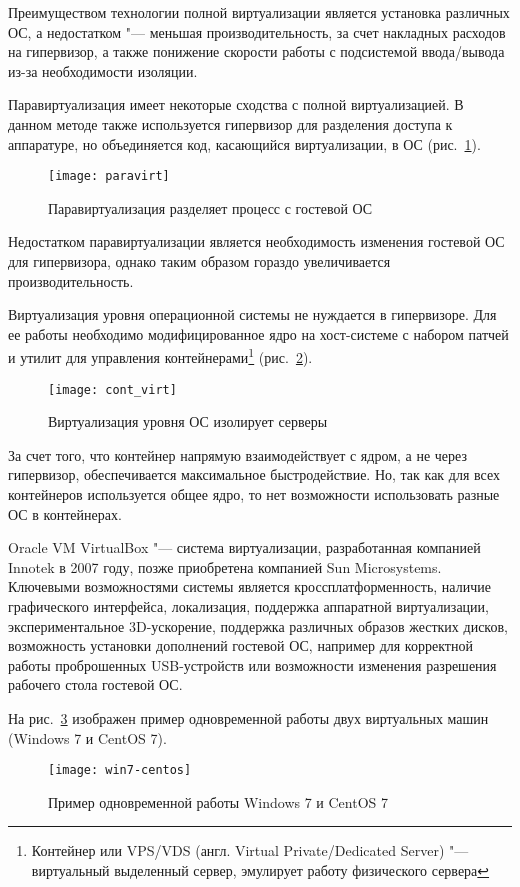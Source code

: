 Преимуществом технологии полной виртуализации является установка различных ОС, а недостатком "--- меньшая производительность, за счет накладных расходов на гипервизор, а также понижение скорости работы с подсистемой ввода/вывода из-за необходимости изоляции.

Паравиртуализация имеет некоторые сходства с полной виртуализацией.
В данном методе также используется гипервизор для разделения доступа к аппаратуре, но объединяется код, касающийся виртуализации, в ОС (рис.~\ref{pic:paravirt}).
\begin{figure}[ht]
    \centering
	\texttt{[image: paravirt]}
	\caption{Паравиртуализация разделяет процесс с гостевой ОС}\label{pic:paravirt}
\end{figure}

Недостатком паравиртуализации является необходимость изменения гостевой ОС для гипервизора, однако таким образом гораздо увеличивается производительность.

Виртуализация уровня операционной системы не нуждается в гипервизоре.
Для ее работы необходимо модифицированное ядро на хост-системе с набором патчей и утилит для управления контейнерами\footnote{Контейнер или VPS/VDS (англ. Virtual Private/Dedicated Server) "--- виртуальный выделенный сервер, эмулирует работу физического сервера} (рис.~\ref{pic:cont_virt}).
\begin{figure}[ht]
    \centering
	\texttt{[image: cont\_virt]}
	\caption{Виртуализация уровня ОС изолирует серверы}\label{pic:cont_virt}
\end{figure}

За счет того, что контейнер напрямую взаимодействует с ядром, а не через гипервизор, обеспечивается максимальное быстродействие. Но, так как для всех контейнеров используется общее ядро, то нет возможности использовать разные ОС в контейнерах.

Oracle VM VirtualBox "--- система виртуализации, разработанная компанией Innotek в 2007 году, позже приобретена компанией Sun Microsystems.
Ключевыми возможностями системы является кроссплатформенность, наличие графического интерфейса, локализация, поддержка аппаратной виртуализации, экспериментальное 3D-ускорение, поддержка различных образов жестких дисков, возможность установки дополнений гостевой ОС, например для корректной работы проброшенных USB-устройств или возможности изменения разрешения рабочего стола гостевой ОС.

На рис.~\ref{pic:win7-centos} изображен пример одновременной работы двух виртуальных машин (Windows 7 и CentOS 7).
\begin{figure}[ht]
    \centering
	\texttt{[image: win7-centos]}
	\caption{Пример одновременной работы Windows 7 и CentOS 7}\label{pic:win7-centos}
\end{figure}

